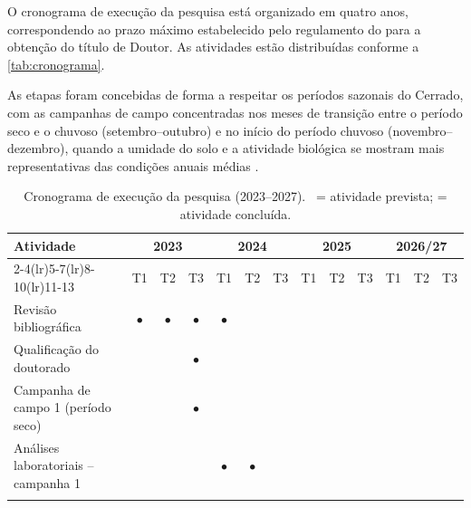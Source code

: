 
O cronograma de execução da pesquisa está organizado em quatro anos,
correspondendo ao prazo máximo estabelecido pelo regulamento do
para a obtenção do título de Doutor. As atividades estão distribuídas
conforme a \autoref{tab:cronograma}.

As etapas foram concebidas de forma a respeitar os períodos sazonais
do Cerrado, com as campanhas de campo concentradas nos meses de
transição entre o período seco e o chuvoso (setembro--outubro) e no
início do período chuvoso (novembro--dezembro), quando a umidade do
solo e a atividade biológica se mostram mais representativas das
condições anuais médias \cite{exemplo:artigo:2024}.

\begin{table}[H]
  \centering
  \caption{Cronograma de execução da pesquisa (2023--2027).
           \textbullet\ = atividade prevista; \textbf{\textbullet} = atividade concluída.}
  \label{tab:cronograma}
  \small
  \begin{tabularx}{\textwidth}{Xcccccccccccc}
    \toprule
    \multirow{2}{*}{\textbf{Atividade}}
      & \multicolumn{3}{c}{\textbf{2023}}
      & \multicolumn{3}{c}{\textbf{2024}}
      & \multicolumn{3}{c}{\textbf{2025}}
      & \multicolumn{3}{c}{\textbf{2026/27}} \\
    \cmidrule(lr){2-4}\cmidrule(lr){5-7}\cmidrule(lr){8-10}\cmidrule(lr){11-13}
      & T1 & T2 & T3
      & T1 & T2 & T3
      & T1 & T2 & T3
      & T1 & T2 & T3 \\
    \midrule
    Revisão bibliográfica
      & $\bullet$ & $\bullet$ & $\bullet$
      & $\bullet$ &            &
      &            &            &
      &            &            & \\
    \thinrule
    Qualificação do doutorado
      &            &            & $\bullet$
      &            &            &
      &            &            &
      &            &            & \\
    \thinrule
    Campanha de campo 1 (período seco)
      &            &            & $\bullet$
      &            &            &
      &            &            &
      &            &            & \\
    \thinrule
    Análises laboratoriais -- campanha 1
      &            &            &
      & $\bullet$ & $\bullet$ &
      &            &            &
      &            &            & \\
    \thinrule

\end{tabularx}
\end{table}
